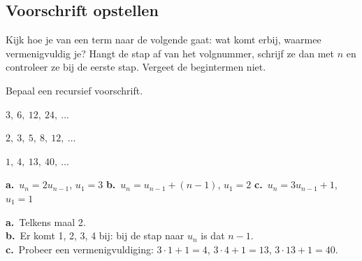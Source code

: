 \subsection{Voorschrift opstellen}

\begin{werkwijze}
Kijk hoe je van een term naar de volgende gaat: wat komt erbij, waarmee vermenigvuldig je? Hangt de stap af van het volgnummer, schrijf ze dan met $n$ en controleer ze bij de eerste stap. Vergeet de begintermen niet.
\end{werkwijze}



\begin{oefeningen}
\begin{oefening}
Bepaal een recursief voorschrift.
\begin{reeks}
  \item $3,\ 6,\ 12,\ 24,\ \ldots$
  \item $2,\ 3,\ 5,\ 8,\ 12,\ \ldots$
  \item $1,\ 4,\ 13,\ 40,\ \ldots$
\end{reeks}
\begin{solution}
\textbf{a.}~$u_n=2u_{n-1}$, $u_1=3$ \quad \textbf{b.}~$u_n=u_{n-1}+(n-1)$, $u_1=2$ \quad \textbf{c.}~$u_n=3u_{n-1}+1$, $u_1=1$
\end{solution}
\begin{fullsolution}
\textbf{a.}~Telkens maal 2.\\
\textbf{b.}~Er komt 1, 2, 3, 4 bij: bij de stap naar $u_n$ is dat $n-1$.\\
\textbf{c.}~Probeer een vermenigvuldiging: $3\cdot 1+1=4$, $3\cdot 4+1=13$, $3\cdot 13+1=40$.
\end{fullsolution}
\end{oefening}
\end{oefeningen}

